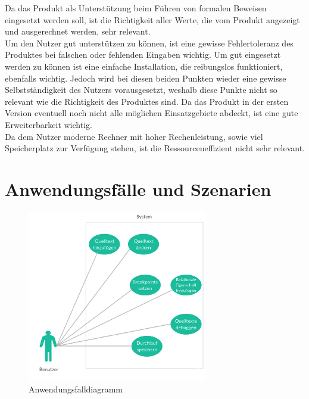 \documentclass[parskip=full]{scrartcl}
\begin{document}
Da das Produkt als Unterstützung beim Führen von formalen Beweisen eingesetzt werden soll, ist die Richtigkeit aller Werte, die vom Produkt angezeigt und ausgerechnet werden, sehr relevant. \\
Um den Nutzer gut unterstützen zu können, ist eine gewisse Fehlertoleranz des Produktes bei falschen oder fehlenden Eingaben wichtig. Um gut eingesetzt werden zu können ist eine einfache Installation, die reibungslos funktioniert, ebenfalls wichtig. Jedoch wird bei diesen beiden Punkten wieder eine gewisse Selbstständigkeit des Nutzers vorausgesetzt, weshalb diese Punkte nicht so relevant wie die Richtigkeit des Produktes sind.
Da das Produkt in der ersten Version eventuell noch nicht alle möglichen Einsatzgebiete abdeckt, ist eine gute Erweiterbarkeit wichtig. \\
Da dem Nutzer moderne Rechner mit hoher Rechenleistung, sowie viel Speicherplatz zur Verfügung stehen, ist die Ressourceneffizient nicht sehr relevant. 
 

\newpage
\section{Anwendungsfälle und Szenarien}
\begin{figure}[h] 
  \centering
     \includegraphics[width=0.7\textwidth]{Anwendungsfalldiagramm}
  \caption{Anwendungsfalldiagramm}
  \label{fig:Bild1}
\end{figure}
\end{document}

